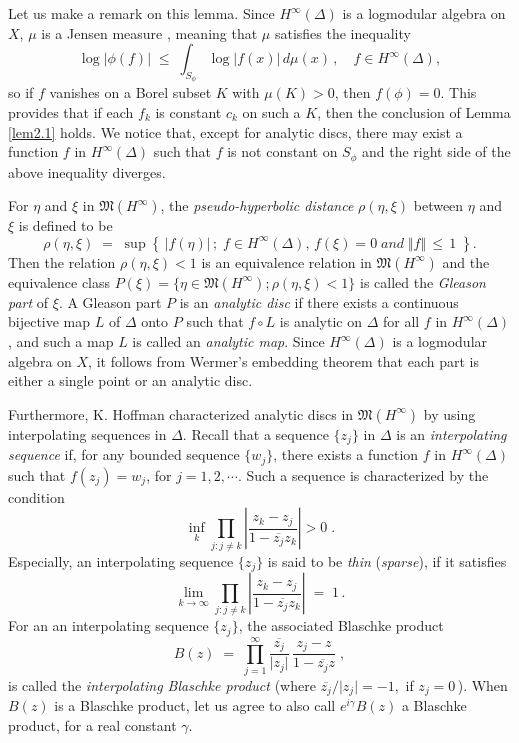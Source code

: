 \documentclass[12pt]{amsart}
\theoremstyle{plain}
\numberwithin{equation}{section}
\begin{document}
Let us make a remark on this lemma. Since $H^\infty(\Delta)$ is a
logmodular algebra on $X$, $\mu$ is a Jensen measure , meaning that
$\mu$ satisfies the inequality
$$
\log \vert \phi(f)\vert \;\le\; \int_{S_{\phi}}
 \log \vert f(x) \vert\, d\mu(x) \,,\quad f \in H^\infty(\Delta) ,
$$
so if $f$ vanishes on a Borel subset $K$ with $\mu(K)>0$,
then $f(\phi) = 0$. This provides that if each $f_k$ is constant
$c_k$ on such a $K$, then the conclusion of Lemma \ref{lem2.1} holds.
We notice that, except for analytic discs, there may exist a
function $f$ in $H^\infty(\Delta)$ such that $f$ is not constant
on $S_\phi$ and the right side of the above inequality diverges.


\medskip
For $\eta$ and $\xi$ in $\mathfrak{M}(H^\infty)$, the
\textit{pseudo-hyperbolic distance} $\rho(\eta,\xi)$ between
$\eta$ and $\xi$ is defined to be
$$
\rho(\eta,\xi)\;=\; \sup\left\{\,\vert f(\eta)\vert \,;\;
f \in H^\infty(\Delta), \,f(\xi)=0 \; and \; \Vert f \Vert \,\leq\, 1 \;\right\}.
$$
Then the relation $\rho(\eta,\xi)< 1$ is an equivalence relation in $\mathfrak{M}(H^\infty)$ and
the equivalence class $P(\xi)=\{ \eta \in \mathfrak{M}(H^\infty);\rho(\eta,\xi)< 1\}$ is called the \textit{Gleason part} of $\xi$. A Gleason part $P$ is an \textit{analytic disc} if there exists a continuous
bijective map $L$ of $\Delta$ onto $P$ such that
$f\circ L$ is analytic on $\Delta$ for all $f$ in
$H^\infty(\Delta)$, and such a map $L$ is called an \textit{analytic map}.
Since $H^\infty(\Delta)$ is a logmodular algebra on $X$, it follows
from Wermer's embedding theorem that
each part is either a single point or an analytic disc.

Furthermore, K. Hoffman \cite{H2} characterized analytic discs in $\mathfrak{M}(H^\infty)$ by using interpolating sequences in $\Delta$.
Recall that a sequence $\{z_j\}$ in $\Delta$ is an
\textit{interpolating sequence} if,
for any bounded sequence $\{w_j\}$, there exists
a function $f$ in $H^\infty(\Delta)$ such that
$f(z_j)=w_j$, for $j = 1, 2, \cdots.$
Such a sequence is characterized by the condition
$$
\inf_{k} \prod_{j:j\not= k} \left \vert
\frac{z_k - z_j}{1 - \overline{z_j}z_k} \right \vert
> 0\;.
$$
Especially, an interpolating sequence $\{z_j\}$ is
said to be \textit{thin} (\textit{sparse}), if it satisfies
$$
\lim_{k\to \infty} \prod_{j:j \not= k} \left \vert
\frac{z_k - z_j}{1 - \overline{z_j}z_k} \right \vert
\;=\;1\,.
$$
For an  an interpolating sequence $\{z_j\}$, the associated
Blaschke product
\begin{equation}
\label{eq2.1}
B(z)\;=\; \prod_{j= 1}^\infty \frac{\overline{z_j}}{\vert z_j\vert} \, \frac{z_j - z}{1 - \overline{z_j}z}\;,
\end{equation}
is called the \textit{interpolating Blaschke product\/} (where $\overline{z_j}/\vert z_j\vert=-1,$ if $z_j=0$\,). When $B(z)$
is a Blaschke product, let us agree to also call $e^{i\gamma}B(z)$
a Blaschke product, for a real constant $\gamma$.
\end{document}
